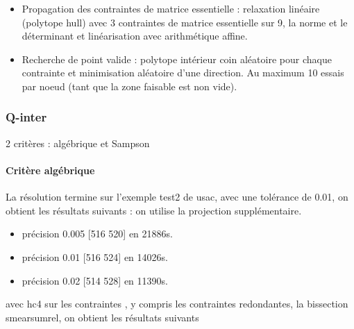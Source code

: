 \documentclass{article}
\begin{document}
\begin{itemize}
\item {Propagation des contraintes de matrice essentielle} :  relaxation lin\'eaire (polytope hull) avec 3 contraintes de matrice essentielle sur 9, la norme et le d\'eterminant et lin\'earisation avec arithm\'etique affine. 

\item{Recherche de point valide} : polytope int\'erieur  coin al\'eatoire pour chaque contrainte et  minimisation al\'eatoire d'une direction. Au maximum 10 essais par noeud  (tant que la zone faisable est non vide).

\end{itemize}


\subsubsection{Q-inter}

2 crit\`eres  :  alg\'ebrique et Sampson

\paragraph{Crit\`ere alg\'ebrique} 

La  r\'esolution termine sur l'exemple test2 de usac,  avec une tol\'erance de 0.01, on obtient les r\'esultats suivants :
on utilise la projection  suppl\'ementaire.
\begin{itemize}
\item  pr\'ecision 0.005  [516 520] en  21886s.

\item pr\'ecision 0.01  [516 524] en  14026s.

\item pr\'ecision 0.02  [514 528] en 11390s.

\end{itemize}

avec hc4 sur les contraintes , y compris les contraintes redondantes, la bissection smearsumrel,  on 
obtient les r\'esultats suivants 
\end{document}
